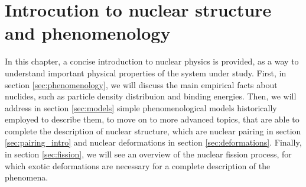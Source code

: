 \chapter{Introcution to nuclear structure and phenomenology}
In this chapter, a concise introduction to nuclear physics is provided, as a way to understand important physical properties of the system under study.
First, in section \ref{sec:phenomenology}, we will discuss the main empirical facts about nuclides, such as particle density distribuion and binding energies. Then, we will address in section \ref{sec:models} simple phenomenological models historically employed to describe them, to move on to more advanced topics, that are able to complete the description of nuclear structure, which are nuclear pairing in section \ref{sec:pairing_intro} and nuclear deformations in section \ref{sec:deformations}.
Finally, in section \ref{sec:fission}, we will see an overview of the nuclear fission process, for which exotic deformations are necessary for a complete description of the phenomena.
\label{chap:intro}



